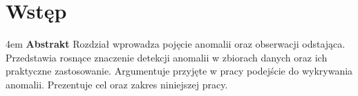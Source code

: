 \chapter{Wstęp}
\label{chap:wstep}

\begingroup
\leftskip4em
\rightskip\leftskip
\noindent 
\textbf{Abstrakt} Rozdział wprowadza pojęcie anomalii oraz obserwacji odstająca. Przedstawia rosnące znaczenie detekcji anomalii w zbiorach danych oraz ich praktyczne zastosowanie. Argumentuje przyjęte w pracy podejście do wykrywania anomalii. Prezentuje cel oraz zakres niniejszej pracy.\par
\endgroup



